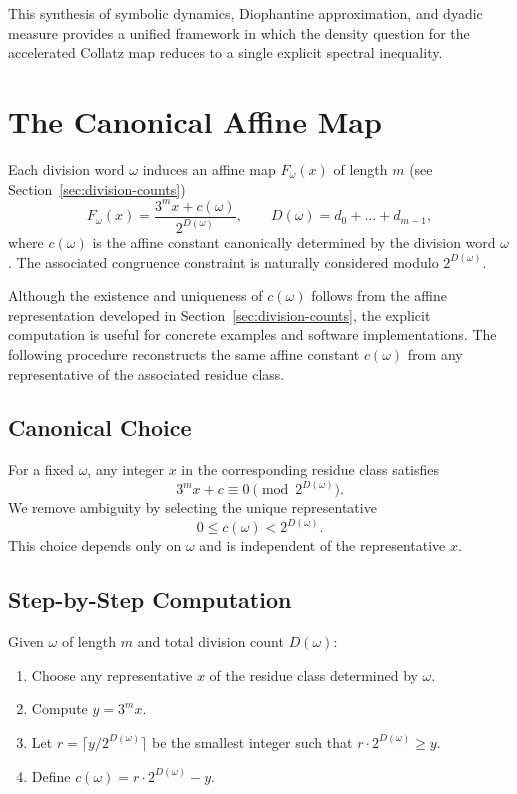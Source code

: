 \documentclass[12pt, oneside]{article}
\numberwithin{equation}{section}
\theoremstyle{definition}
\theoremstyle{plain}
\theoremstyle{remark}
\begin{document}
This synthesis of symbolic dynamics, Diophantine approximation, and dyadic measure provides
a unified framework in which the density question for the accelerated Collatz map reduces
to a single explicit spectral inequality.


\appendix

\newpage
\section{The Canonical Affine Map}
\label{app:canonical-c}

Each division word \(\omega\) induces an affine map \(F_\omega(x)\) of length $m$
(see Section~\ref{sec:division-counts})
\[
F_\omega(x) = \frac{3^m x + c(\omega)}{2^{D(\omega)}}, \qquad D(\omega) = d_0 + \dots + d_{m-1},
\]
where \(c(\omega)\) is the affine constant canonically determined by the
division word \(\omega\).  The associated congruence constraint is naturally
considered modulo \(2^{D(\omega)}\).

Although the existence and uniqueness of \(c(\omega)\) follows from the affine representation
developed in Section~\ref{sec:division-counts}, the explicit computation is useful for concrete
examples and software implementations. The following procedure reconstructs the same affine
constant \(c(\omega)\) from any representative of the associated residue class.

\subsection{Canonical Choice}

For a fixed \(\omega\), any integer \(x\) in the corresponding residue class satisfies
\[
3^m x + c \equiv 0 \pmod{2^{D(\omega)}}.
\]
We remove ambiguity by selecting the unique representative
\[
0 \le c(\omega) < 2^{D(\omega)}.
\]
This choice depends only on \(\omega\) and is independent of the representative \(x\).

\subsection{Step-by-Step Computation}

Given \(\omega\) of length \(m\) and total division count \(D(\omega)\):

\begin{enumerate}
\item Choose any representative \(x\) of the residue class determined by \(\omega\).  
\item Compute \(y = 3^m x\).  
\item Let \(r = \lceil y / 2^{D(\omega)} \rceil\) be the smallest integer such that \(r \cdot 2^{D(\omega)} \ge y\).  
\item Define \(c(\omega) = r \cdot 2^{D(\omega)} - y\).  
\end{enumerate}
\end{document}

